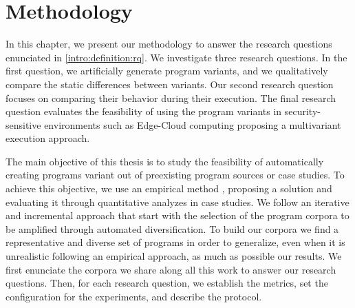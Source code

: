\chapter{Methodology} 
\label{chapter:method}

\pagestyle{plain}
\newcommand{\libsodiumfunctions}{869}
\newcommand{\qrcodefunctions}{1849}
\newcommand{\allmewefunctions}{\libsodiumfunctions + \qrcodefunctions}

\newcommand{\py}[1]{}
\newcommand{\fromjson}[2]{}

\newcommand{\corpusrosetta}{\fromjson{data/crow_corpus.json}{.[0].name}}
\newcommand{\corpussodium}{Libsodium\xspace}
\newcommand{\corpusqrcode}{QrCode\xspace}


\newcommand{\DTWStatic}{dt\_static\xspace}
\newcommand{\DTW}{dt\_dyn\xspace}
\newcommand{\tool}{CROW\xspace}


In this chapter, we present our methodology to answer the research questions enunciated in \autoref{intro:definition:rq}.
We investigate three research questions. In the first question, we artificially generate \wasm program variants, and we qualitatively compare the static differences between variants. 
Our second research question focuses on comparing their behavior during their execution.
The final research question evaluates the feasibility of using the program variants in security-sensitive environments such as Edge-Cloud computing proposing a multivariant execution approach.

The main objective of this thesis is to study the feasibility of automatically creating programs variant out of preexisting program sources or case studies. To achieve this objective,
we use an empirical method \cite{Runeson2020}, proposing a solution and evaluating it through quantitative analyzes in case studies. We follow an iterative and incremental approach that start with the selection of the program corpora to be amplified through automated diversification. To build our corpora we find a representative and diverse set of programs in order to generalize, even when it is unrealistic following an empirical approach, as much as possible our results.
We first enunciate the corpora we share along all this work to answer our research questions. Then, for each research question, we establish the metrics, set the configuration for the experiments, and describe the protocol.


